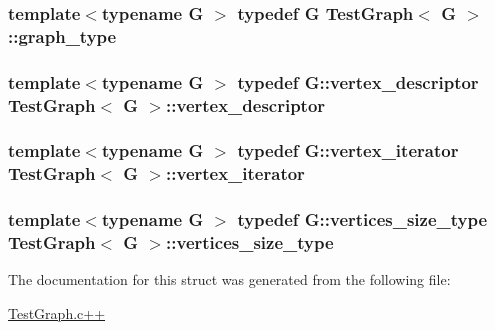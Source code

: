 \hypertarget{structTestGraph_a149d9d185e2299b108590e2f83804351}{
\subsubsection[{graph\-\_\-type}]{\setlength{\rightskip}{0pt plus 5cm}template$<$typename G $>$ typedef G {\bf Test\-Graph}$<$ G $>$\-::{\bf graph\-\_\-type}}}\label{structTestGraph_a149d9d185e2299b108590e2f83804351}
\hypertarget{structTestGraph_aa82e61846643af7ce36a6993b81b9aa3}{
\subsubsection[{vertex\-\_\-descriptor}]{\setlength{\rightskip}{0pt plus 5cm}template$<$typename G $>$ typedef G\-::vertex\-\_\-descriptor {\bf Test\-Graph}$<$ G $>$\-::{\bf vertex\-\_\-descriptor}}}\label{structTestGraph_aa82e61846643af7ce36a6993b81b9aa3}
\hypertarget{structTestGraph_ae82be295babd001adfdf636fc39a79f8}{
\subsubsection[{vertex\-\_\-iterator}]{\setlength{\rightskip}{0pt plus 5cm}template$<$typename G $>$ typedef G\-::vertex\-\_\-iterator {\bf Test\-Graph}$<$ G $>$\-::{\bf vertex\-\_\-iterator}}}\label{structTestGraph_ae82be295babd001adfdf636fc39a79f8}
\hypertarget{structTestGraph_a808d6ca09652f1c14f6a68ca42beb447}{
\subsubsection[{vertices\-\_\-size\-\_\-type}]{\setlength{\rightskip}{0pt plus 5cm}template$<$typename G $>$ typedef G\-::vertices\-\_\-size\-\_\-type {\bf Test\-Graph}$<$ G $>$\-::{\bf vertices\-\_\-size\-\_\-type}}}\label{structTestGraph_a808d6ca09652f1c14f6a68ca42beb447}


The documentation for this struct was generated from the following file\-:\begin{DoxyCompactItemize}
\item 
\hyperlink{TestGraph_8c_09_09}{Test\-Graph.\-c++}\end{DoxyCompactItemize}
